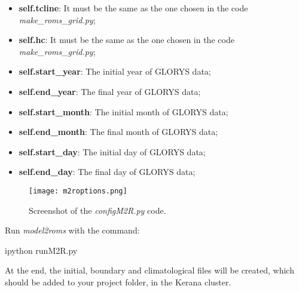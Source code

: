 \begin{itemize}
    \item \textbf{self.tcline}: It must be the same as the one chosen in the code \textit{make\_roms\_grid.py};   
    \item \textbf{self.hc}: It must be the same as the one chosen in the code \textit{make\_roms\_grid.py};
    \item \textbf{self.start\_year}: The initial year of GLORYS data;
    \item \textbf{self.end\_year}: The final year of GLORYS data;
    \item \textbf{self.start\_month}: The initial month of GLORYS data;
    \item \textbf{self.end\_month}: The final month of GLORYS data;
    \item \textbf{self.start\_day}: The initial day of GLORYS data;
    \item \textbf{self.end\_day}: The final day of GLORYS data;
\end{itemize}
\bigskip

\begin{figure}[H]
    \centering
    \texttt{[image: m2roptions.png]}
    \caption{Screenshot of the \textit{configM2R.py} code.}
    \label{m2roptions}
\end{figure}
\bigskip

Run \textit{model2roms} with the command:
\bigskip

\begin{bashcode}
ipython runM2R.py
\end{bashcode}
\bigskip

At the end, the initial, boundary and climatological files will be created, which should be added to your project folder, in the Kerana cluster.
\bigskip
   
